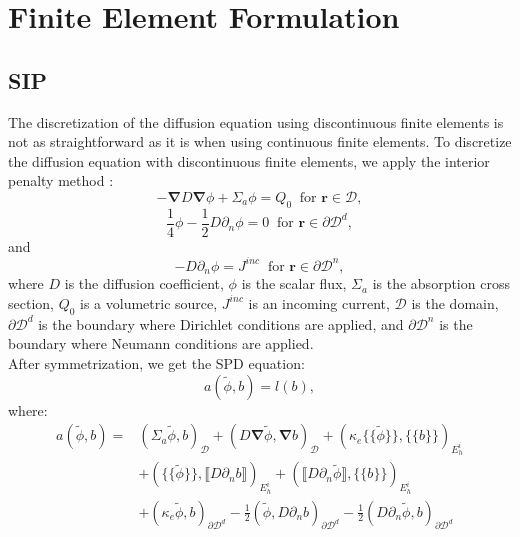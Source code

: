 \documentclass[preprint,10pt]{elsarticle}
\newcommand\bn{\boldsymbol{\nabla}}
\newcommand\br{\mathbf{r}}
\newcommand\ldb{\{\!\!\{}
\newcommand\rdb{\}\!\!\}}
\newcommand\llb{\llbracket}
\newcommand\rrb{\rrbracket}
\newcommand\mc{\mathcal}
\renewcommand{\(}{\left(}
\renewcommand{\)}{\right)}
\renewcommand{\[}{\left[}
\renewcommand{\]}{\right]}
\begin{document}
\section{Finite Element Formulation} \label{sec:ip}
 
\subsection{SIP}

The discretization of the diffusion equation using discontinuous finite
elements is not as straightforward as it is when using continuous finite
elements. To discretize the diffusion equation with discontinuous finite elements, 
we apply the interior penalty method \cite{Kanschat2007}:
\begin{equation}
  -\bn D \bn \phi + \Sigma_a \phi = Q_0\ \textrm{ for } \br \in \mc{D},
\end{equation}
\begin{equation}
  \frac{1}{4}\phi - \frac{1}{2} D \partial_n \phi =0\ \textrm{ for } \br \in
  \partial \mc{D}^d,
\end{equation}
and
\begin{equation}
  -D \partial_n \phi = J^{inc}\ \textrm{ for } \br \in \partial \mc{D}^n,
\end{equation}
where $D$ is the diffusion coefficient, $\phi$ is the scalar flux, $\Sigma_a$
is the absorption cross section, $Q_0$ is a volumetric source, $J^{inc}$ is an
incoming current, $\mc{D}$ is the domain, $\partial \mc{D}^d$ is the boundary 
where Dirichlet conditions are applied, and $\partial \mc{D}^n$ is the boundary 
where Neumann conditions are applied.\\ 
After symmetrization, we get the SPD equation:
\begin{equation}
  a(\tilde{\phi},b) = l(b),
\end{equation}
where:
\begin{equation}
  \begin{split}
    a (\tilde{\phi},b) =& \(\Sigma_a \tilde{\phi},b\)_{\mc{D}} + 
    \(D\bn\tilde{\phi},\bn b\)_{\mc{D}} +
    (\kappa_e\ldb\tilde{\phi}\rdb,\ldb b \rdb)_{E_h^i}\\
    &+ \(\ldb\tilde{\phi}\rdb,\llb D\partial_n b \rrb\)_{E_h^i}+ \(\llb D
    \partial_n \tilde{\phi}\rrb,\ldb b \rdb\)_{E_h^i}\\
    &+ \(\kappa_e \tilde{\phi}, b\)_{\partial \mc{D}^d}
    -\frac{1}{2}\(\tilde{\phi},D\partial_n b\)_{\partial \mc{D}^d}
    -\frac{1}{2}\(D\partial_n\tilde{\phi},b\)_{\partial \mc{D}^d}
  \end{split}
\end{equation}
\end{document}
